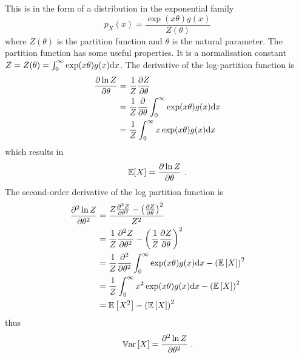 This is in the form of a distribution in the exponential family
\begin{equation}
  p_X(x)=\dfrac{\exp\left(x\theta\right)g(x)}{Z(\theta)}
\end{equation}
where $Z(\theta)$ is the partition function and $\theta$ is the natural parameter. The partition function has some useful properties. It is a normalisation constant $Z=Z(\theta)=\int_{0}^{\infty}\exp(x\theta)g(x)\mathrm{d} x$. The derivative of the log-partition function is
\begin{align*}
  \dfrac{\partial \ln Z}{\partial \theta} &= \dfrac{1}{Z}\dfrac{\partial Z}{\partial \theta}
  \\
  & = \dfrac{1}{Z}\dfrac{\partial}{\partial \theta} \int_0^\infty \exp(x\theta) g(x) \mathrm{d} x
  \\
  & = \dfrac{1}{Z}\int_0^\infty x \exp(x\theta) g(x) \mathrm{d} x
\end{align*}
which results in
\begin{equation}
\operatorname{\mathbb{E}}[X] = \dfrac{\partial \ln Z}{\partial \theta} \ .
\end{equation}
The second-order derivative of the log partition function is
\begin{align*}
  \dfrac{\partial^2\ln Z}{\partial \theta^2} &=
  \dfrac{
    Z\frac{\partial^2 Z}{\partial\theta^2}-\left(\frac{\partial Z}{\partial\theta}\right)^2
  }{
    Z^2
  }
  \\
  &=\dfrac{1}{Z}\dfrac{\partial^2 Z}{\partial \theta^2} - \left(\dfrac{1}{Z}\dfrac{\partial Z}{\partial \theta}\right)^2
  \\
  &=\dfrac{1}{Z}\dfrac{\partial^2}{\partial \theta^2}\int_0^\infty \exp(x\theta) g(x) \mathrm{d} x - \left(\operatorname{\mathbb{E}}\left[X\right]\right)^2
  \\
  &=\dfrac{1}{Z}\int_0^\infty x^2\exp(x\theta) g(x) \mathrm{d} x - \left(\operatorname{\mathbb{E}}\left[X\right]\right)^2
  \\
  &=\operatorname{\mathbb{E}}\left[X^2\right] - \left(\operatorname{\mathbb{E}}\left[X\right]\right)^2
\end{align*}
thus
\begin{equation}
\operatorname{\mathbb{V}ar}\left[X\right] = \dfrac{\partial^2\ln Z}{\partial \theta^2} \ .
\label{eq:appendix_variancePartitionFunction}
\end{equation}


